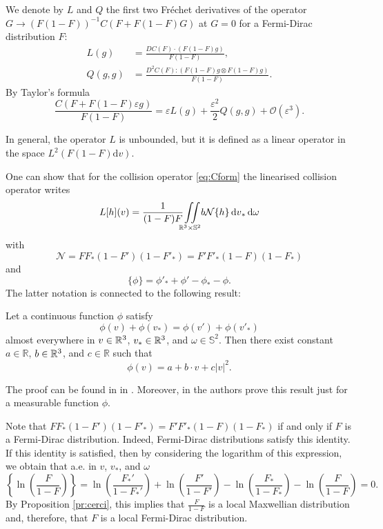 We denote by $L$ and $Q$ the first two Fréchet derivatives of the operator 
$G\to (F(1-F))^{-1}C(F+F(1-F)G)$ at $G=0$ for a Fermi-Dirac distribution $F$:
\begin{equation}\begin{aligned}
L(g)&=\frac{DC(F)\cdot (F(1-F)g)}{F(1-F)},\\Q(g,g)&=\frac{D^2C(F): 
(F(1-F)g\otimes F(1-F)g)}{F(1-F)}.\end{aligned}
\end{equation}
By Taylor's formula%
\begin{equation}\label{eq:expansion}
\frac{C(F+F(1-F)\varepsilon g)}{F(1-F)}= \varepsilon L(g) +\frac{\varepsilon^2}{2} Q(g,g)+\mathcal O(\varepsilon^3).
\end{equation}

In general, the operator $L$ is unbounded, but it is defined as a linear operator 
in the space $L^2(F(1-F)\mathrm dv)$. 

One can show that for the collision operator \eqref{eq:Cform} the linearised collision operator writes
   \begin{equation}\label{eq:L:form}
   	L[h](v)=\frac{1}{ (1-F)F }{\iint\limits_{\mathbb R^3\times\mathbb S^2}} b\mathcal N \{h \} {\,\mathrm{d} v}_\ast{\,\mathrm{d} \omega} 
   \end{equation}
with\[\mathcal N = FF_\ast(1-F')(1-F'_\ast)=F'F'_\ast(1-F)(1-F_\ast)\]
and\[\{\phi\}=\phi'_\ast+\phi'-\phi_\ast-\phi.\]
The latter notation is connected to the following result:
\begin{proposition}\label{pr:cerci}
Let a continuous function $\phi$ satisfy
\[\phi(v)+\phi(v_\ast)=\phi(v')+\phi(v'_\ast)\]
almost everywhere in $v\in {\mathbb {R}^3}$, $v_\ast\in {\mathbb {R}^3}$, and $\omega\in\mathbb S^2$. Then there exist
constant $a\in \mathbb R$, $b\in {\mathbb {R}^3}$, and $c\in   \mathbb R$ such that
\[\phi(v)=a+b\cdot v+ c|v|^2.\]
\end{proposition}
The proof can be found in in \cite{cercignani1988boltzmann,Glassey1987Cauchy}. Moreover, in \cite{cercignani1994mathematical} the authors prove this result just for a measurable function $\phi$.

Note that $FF_\ast(1-F')(1-F'_\ast)=F'F'_\ast(1-F)(1-F_\ast)$ if and only if $F$ is a Fermi-Dirac distribution.
Indeed, Fermi-Dirac distributions satisfy this identity. If this identity is satisfied, then by considering the logarithm of this expression, we obtain that a.e. in $v$, $v_*$, and $\omega$
\[\left\{\ln\left( \frac{F}{1-F} \right)\right\}= \ln\left( \frac{F_*'}{1-F_*'} \right) +\ln\left( \frac{F'}{1-F'} \right)-\ln\left( \frac{F_*}{1-F_*} \right)-\ln\left( \frac{F}{1-F} \right)=0.\]
By Proposition \ref{pr:cerci}, this implies that $\frac{F}{1-F}$ is a local Maxwellian distribution and, therefore, that $F$ is a local Fermi-Dirac distribution.

